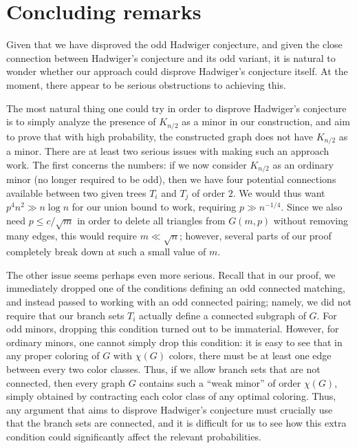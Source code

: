 \documentclass[11pt,reqno,oneside]{amsart}
\theoremstyle{definition}
\newcommand\1{\mathbf{1}}
\let\leq\leqslant
\begin{document}
\section{Concluding remarks}\label{sec:conclusion}

Given that we have disproved the odd Hadwiger conjecture, and given the close connection between Hadwiger's conjecture and its odd variant, it is natural to wonder whether our approach could disprove Hadwiger's conjecture itself. At the moment, there appear to be serious obstructions to achieving this.



The most natural thing one could try in order to disprove Hadwiger's conjecture is to simply analyze the presence of $K_{n/2}$ as a minor in our construction, and aim to prove that with high probability, the constructed graph does not have $K_{n/2}$ as a minor. There are at least two serious issues with making such an approach work. The first concerns the numbers: if we now consider $K_{n/2}$ as an ordinary minor (no longer required to be odd), then we have four potential connections available between two given trees $T_i$ and $T_j$ of order $2$. We would thus want $p^4 n^2 \gg n \log n$ for our union bound to work, requiring $p \gg n^{-1/4}$. Since we also need $p \leq c/\sqrt m$ in order to delete all triangles from $G(m,p)$ without removing many edges, this would require $m \ll \sqrt n$; however, several parts of our proof completely break down at such a small value of $m$.

The other issue seems perhaps even more serious. Recall that in our proof, we immediately dropped one of the conditions defining an odd connected matching, and instead passed to working with an odd connected pairing; namely, we did not require that our branch sets $T_i$ actually define a connected subgraph of $G$. For odd minors, dropping this condition turned out to be immaterial. However, for ordinary minors, one cannot simply drop this condition: it is easy to see that in any proper coloring of $G$ with $\chi(G)$ colors, there must be at least one edge between every two color classes. Thus, if we allow branch sets that are not connected, then every graph $G$ contains such a ``weak minor'' of order $\chi(G)$, simply obtained by contracting each color class of any optimal coloring. Thus, any argument that aims to disprove Hadwiger's conjecture must crucially use that the branch sets are connected, and it is difficult for us to see how this extra condition could significantly affect the relevant probabilities. 
\end{document}
